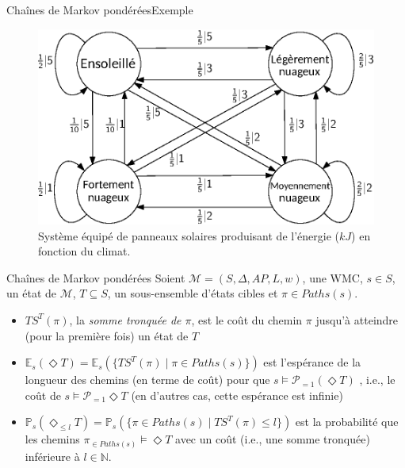 \documentclass[compress]{beamer}
\begin{document}
\begin{frame}{Chaînes de Markov pondérées}{Exemple}
\begin{figure}
  \includegraphics[width=0.8\linewidth]{resources/weather}
  \caption{Système équipé de panneaux solaires produisant de l'énergie ($kJ$) en fonction du climat.}
\end{figure}
\end{frame}

\begin{frame}{Chaînes de Markov pondérées}
    Soient $\mathcal{M} = (S, \Delta, AP, L, w)$, une WMC, $s \in S$, un état
    de $\mathcal{M}$, $T \subseteq S$, un sous-ensemble d'états cibles et $\pi \in Paths(s)$.
  \begin{itemize}
  \item $TS^T(\pi)$, la \textit{\color{fibeamer@orange}somme tronquée de $\pi$}, est le coût du chemin $\pi$ jusqu'à atteindre {(pour la première fois)} un état de $T$
  \item $\mathbb{E}_s(\Diamond T) = \mathbb{E}_s(\{ TS^T(\pi) \; | \; \pi \in Paths(s)  \})$ est l'espérance de la longueur des chemins (en terme de coût) pour que $s \models \mathcal{P}_{=1}(\Diamond T)$
, i.e., le coût de $s \models \mathcal{P}_{=1} \Diamond T$ (en d'autres cas, cette espérance est infinie)  \item $\mathbb{P}_s(\Diamond_{\leq l}T) = \mathbb{P}_s(\{ \pi \in Paths(s) \; | \; TS^T(\pi) \leq l \})$ est la probabilité que les chemins $\pi_{\in Paths(s)} \models \Diamond T$ avec un coût (i.e., une somme tronquée) inférieure à $l \in \mathbb{N}$.
  \end{itemize}
\end{frame}
\end{document}
